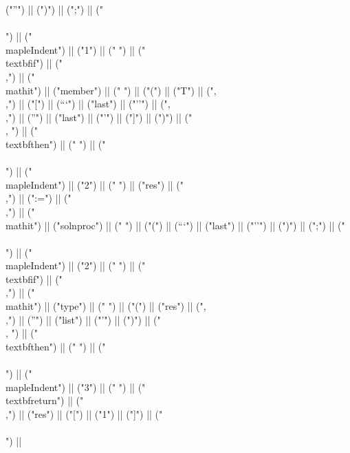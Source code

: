 \documentclass{article}
\begin{document}
\begin{center}
\begin{maplelatex}
{("''") || (")") || (";") || ("\\\\\n") || ("\\mapleIndent{") || ("1") || ("} ") || ("\\textbf{if}") || (" \\,") || ("\\mathit{") || ("member") || ("} ") || ("(") || ("T") || (",\\,") || ("[") || ("``") || ("last") || ("''") || (",\\,") || ("'") || ("last") || ("'") || ("]") || (")") || (" \\, ") || ("\\textbf{then}") || (" ") || ("\\\\\n") || ("\\mapleIndent{") || ("2") || ("} ") || ("res") || ("\\,") || (":=") || ("\\,") || ("\\mathit{") || ("solnproc") || ("} ") || ("(") || ("``") || ("last") || ("''") || (")") || (";") || ("\\\\\n") || ("\\mapleIndent{") || ("2") || ("} ") || ("\\textbf{if}") || (" \\,") || ("\\mathit{") || ("type") || ("} ") || ("(") || ("res") || (",\\,") || ("'") || ("list") || ("'") || (")") || (" \\, ") || ("\\textbf{then}") || (" ") || ("\\\\\n") || ("\\mapleIndent{") || ("3") || ("} ") || ("\\textbf{return}") || ("\\,") || ("res") || ("[") || ("1") || ("]") || ("\\\\\n") || }
\end{maplelatex}
\end{center}
\end{document}

